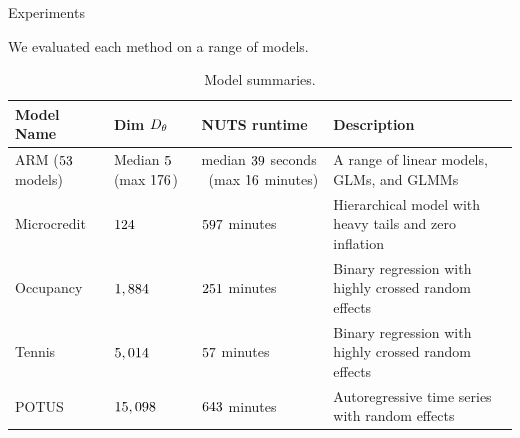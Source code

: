 \documentclass[8pt]{beamer}\usepackage[]{graphicx}\usepackage[]{color}
\begin{document}
\begin{frame}{Experiments}

    We evaluated each method on a range of models.
    
    \begin{table}[h!]
        \begin{tabular}{|x{0.15\textwidth}|x{0.13\textwidth}|x{0.25\textwidth}|x{0.3\textwidth}|}
        \hline\hline
        Model Name  & Dim ${D_{\theta}}$     & NUTS runtime & Description \\
        \hline\hline
        ARM  \newline ($53$ models) &
        Median $5$ 
            \newline(max $176$)&
        median $39$ seconds \
            \newline(max $16$ minutes) 
            &
           A range of linear models, GLMs, and GLMMs \\
        \hline
        Microcredit & $124$ & $597$ minutes &
           Hierarchical model with heavy tails and zero inflation \\
        \hline
        Occupancy & $1,884$ & $251$ minutes &
           Binary regression with highly crossed random effects \\
        \hline
        Tennis & $5,014$ & $57$ minutes &
           Binary regression with highly crossed random effects \\
        \hline
        POTUS & $15,098$ & $643$ minutes &
            Autoregressive time series with random effects \\
        \hline\hline
        \end{tabular}
        \caption{Model summaries.}
        \label{tab:model_desc}
    \end{table}
        
\end{frame}



   
\end{document}
